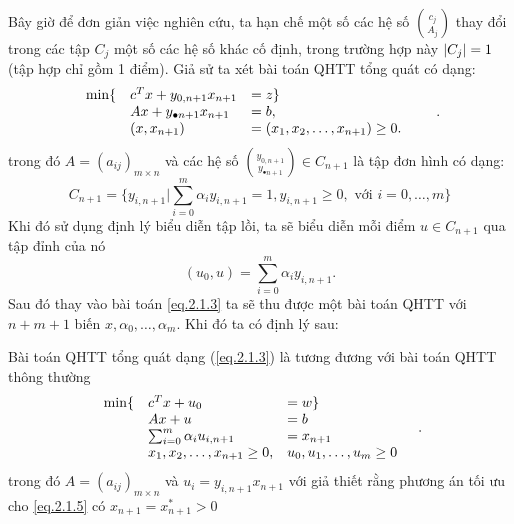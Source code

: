 Bây giờ để đơn giản việc nghiên cứu, ta hạn chế một số các hệ số $\binom{c_j}{A_j}$ thay đổi trong các tập $C_j$ một số các hệ số khác cố định, trong trường hợp này $|C_j| = 1$ (tập hợp chỉ gồm 1 điểm).
Giả sử ta xét bài toán QHTT tổng quát có dạng:
\begin{equation}\label{eq.2.1.3}
 \begin{array}{lllll}
\min\{ &c^Tx+y_{0,n+1}x_{n+1}&=z\}\\
&Ax+y_{\bullet n+1}x_{n+1}&=b,&&\\
&(x,x_{n+1})&=(x_1,x_2,\dots,x_{n+1})\geq0.
\end{array}.
\end{equation}
trong đó $A=(a_{ij})_{m\times n}$ và các hệ số $\binom{y_{0,n+1}}{y_{\bullet n+1}}\in C_{n+1}$ là tập đơn hình có dạng:
\begin{equation}\label{eq.2.1.4}
C_{n+1}=\{y_{i,n+1}| \sum_{i=0}^m\alpha_iy_{i,n+1}=1,y_{i,n+1}\geq0, \textrm{ với }i=0,\dots,m\}
\end{equation}
Khi đó sử dụng định lý biểu diễn tập lồi, ta sẽ biểu diễn mỗi điểm $u\in C_{n+1}$ qua tập đỉnh của nó
\begin{equation}\label{eq.2.1.5}
(u_0, u) = \sum_{i=0}^m\alpha_iy_{i,n+1}.
\end{equation}
Sau đó thay vào bài toán \eqref{eq.2.1.3} ta sẽ thu được một bài toán QHTT với $n+m+1$ biến $x, \alpha_0,\dots, \alpha_m$. 
Khi đó ta có định lý sau:

\begin{theorem}\label{eq.2.1.2}
Bài toán QHTT tổng quát dạng (\ref{eq.2.1.3}) là tương đương với bài toán QHTT thông thường
\begin{equation}\label{eq.2.1.5}
\begin{array}{lllll}
\min\{& c^Tx+u_0&=w\}\\
&Ax+u&=b&\\
&\sum_{i=0}^m\alpha_iu_{i,n+1}&=x_{n+1}\\
&x_1,x_2,\dots,x_{n+1}\geq0,& u_0,u_1,\dots,u_m\geq0
\end{array}.
\end{equation}
trong đó $A=(a_{ij})_{m\times n}$ và $u_i=y_{i,n+1}x_{n+1}$ với giả thiết rằng phương án tối ưu cho \eqref{eq.2.1.5} có $x_{n+1}=x^\ast_{n+1}>0$
\end{theorem}

